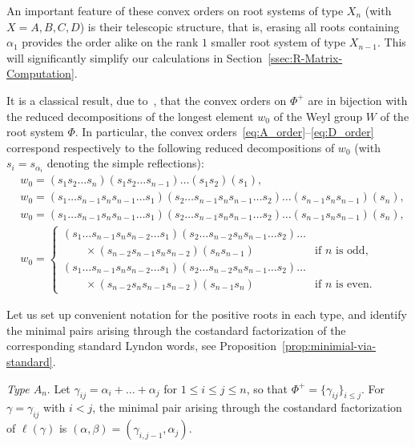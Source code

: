 \documentclass[10pt,a4paper]{amsart}
\numberwithin{equation}{section}
\begin{document}
\begin{Remark}\label{rem:tower-like}
An important feature of these convex orders on root systems of type $X_n$ (with $X=A,B,C,D$) is their telescopic structure, that is, erasing all roots containing $\alpha_1$ provides the order alike on the rank $1$ smaller root system of type $X_{n-1}$. This will significantly simplify our calculations in Section~\ref{ssec:R-Matrix-Computation}.
\end{Remark}

\begin{Remark}%
It is a classical result, due to~\cite{P}, that the convex orders on $\Phi^+$ are in bijection with the reduced decompositions of the longest element $w_0$ of the Weyl group $W$ of the root system $\Phi$. In particular, the convex orders~\eqref{eq:A_order}--\eqref{eq:D_order} correspond respectively to the following reduced decompositions of $w_0$
(with $s_{i} = s_{\alpha_{i}}$ denoting the simple reflections):
\begin{align*}
 &w_{0} = (s_{1}s_{2}\dots s_{n})(s_{1}s_{2}\dots s_{n-1})\dots (s_{1}s_{2})(s_{1}), \\
 &w_{0} = (s_{1}\dots s_{n - 1}s_{n}s_{n-1}\dots s_{1})(s_{2}\dots s_{n-1}s_{n}s_{n-1}\dots s_{2})\dots (s_{n-1}s_{n}s_{n-1})(s_{n}), \\
 &w_{0} = (s_{1}\dots s_{n-1}s_{n}s_{n-1}\dots s_{1})(s_{2}\dots s_{n-1}s_{n}s_{n-1}\dots s_{2})\dots (s_{n-1}s_{n}s_{n-1})(s_{n}), \\
 &w_{0} =
 \begin{cases}
 (s_{1}\dots s_{n-1}s_{n}s_{n-2}\dots s_{1})(s_{2}\dots s_{n-2}s_{n}s_{n-1}\dots s_{2})\dots& \\
 \qquad\times{}(s_{n-2}s_{n-1}s_{n}s_{n-2})(s_{n}s_{n-1}) &\text{if $n$ is odd}, \\
 (s_{1}\dots s_{n-1}s_{n}s_{n-2}\dots s_{1})(s_{2}\dots s_{n-2}s_{n}s_{n-1}\dots s_{2})\dots &\\
 \qquad\times{}(s_{n-2}s_{n}s_{n-1}s_{n-2})(s_{n-1}s_{n}) &\text{if $n$ is even}.
 \end{cases}
\end{align*}
\end{Remark}


Let us set up convenient notation for the positive roots in each type, and identify the minimal pairs arising through the costandard factorization of the corresponding standard Lyndon words, see Proposition~\ref{prop:minimial-via-standard}.


\emph{Type $A_n$}.
Let $\gamma_{ij} = \alpha_{i} + \dots + \alpha_{j}$ for $1 \le i \le j \le n$, so that
$\Phi^+=\{\gamma_{ij}\}_{i\leq j}$. For $\gamma=\gamma_{ij}$ with $i < j$, the minimal pair arising through the costandard factorization of $\ell(\gamma)$ is $(\alpha,\beta)=(\gamma_{i,j - 1},\alpha_{j})$.
\end{document}
